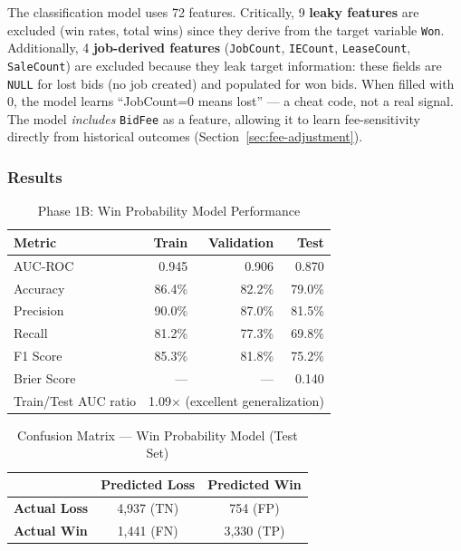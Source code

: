 \documentclass[12pt,a4paper]{article}
\begin{document}
The classification model uses 72 features. Critically, 9 \textbf{leaky features} are excluded (win rates, total wins) since they derive from the target variable \texttt{Won}. Additionally, 4 \textbf{job-derived features} (\texttt{JobCount}, \texttt{IECount}, \texttt{LeaseCount}, \texttt{SaleCount}) are excluded because they leak target information: these fields are \texttt{NULL} for lost bids (no job created) and populated for won bids. When filled with 0, the model learns ``JobCount=0 means lost'' --- a cheat code, not a real signal. The model \emph{includes} \texttt{BidFee} as a feature, allowing it to learn fee-sensitivity directly from historical outcomes (Section~\ref{sec:fee-adjustment}).

\subsubsection{Results}

\begin{table}[H]
\centering
\caption{Phase 1B: Win Probability Model Performance}
\label{tab:winprob-results}
\begin{tabular}{lrrr}
\toprule
\textbf{Metric} & \textbf{Train} & \textbf{Validation} & \textbf{Test} \\
\midrule
AUC-ROC & 0.945 & 0.906 & 0.870 \\
Accuracy & 86.4\% & 82.2\% & 79.0\% \\
Precision & 90.0\% & 87.0\% & 81.5\% \\
Recall & 81.2\% & 77.3\% & 69.8\% \\
F1 Score & 85.3\% & 81.8\% & 75.2\% \\
Brier Score & --- & --- & 0.140 \\
Train/Test AUC ratio & \multicolumn{3}{c}{1.09$\times$ (excellent generalization)} \\
\bottomrule
\end{tabular}
\end{table}

\begin{table}[H]
\centering
\caption{Confusion Matrix --- Win Probability Model (Test Set)}
\label{tab:confusion-matrix}
\begin{tabular}{lcc}
\toprule
& \textbf{Predicted Loss} & \textbf{Predicted Win} \\
\midrule
\textbf{Actual Loss} & 4,937 (TN) & 754 (FP) \\
\textbf{Actual Win} & 1,441 (FN) & 3,330 (TP) \\
\bottomrule
\end{tabular}
\end{table}
\end{document}
